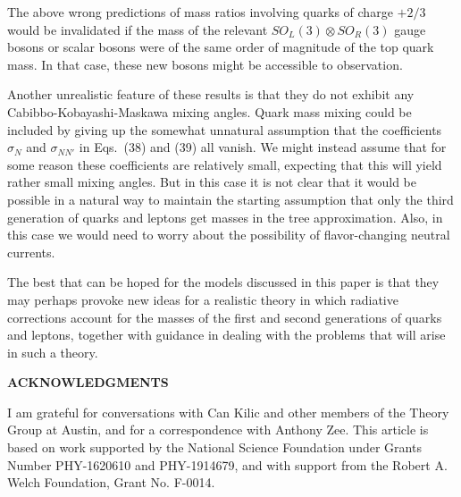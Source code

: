 \documentclass[12pt]{article}
\begin{document}
The above wrong predictions of mass ratios involving quarks of charge $+2/3$ would be invalidated if the mass of the relevant 
$SO_L(3)\otimes  SO_R(3)$ gauge bosons or scalar bosons were of the same order of magnitude of the top quark mass.  In that case, these new bosons might be accessible to observation.

Another unrealistic feature of these results is that they do not exhibit any Cabibbo-Kobayashi-Maskawa mixing angles.  Quark mass mixing could be included  by giving up the somewhat unnatural  assumption that the coefficients $\sigma_N$ and $\sigma_{NN'}$ in Eqs.~(38) and (39) all vanish.  
We might instead assume that for some reason these coefficients are relatively small, expecting that this will  yield rather small mixing angles.  But in this case it is not clear that it would be possible in a natural way to maintain the starting assumption that only the third generation of quarks and leptons get masses in the tree approximation.  Also, in this case we would need to worry about the possibility of flavor-changing neutral currents.

The best that can be hoped for the models discussed in this paper is that  they may perhaps provoke new ideas for  a realistic theory in which  radiative corrections  account for the masses of the first and second generations of quarks and leptons, together with  guidance in dealing with the problems that will arise in such a theory.

\begin{center}
 {\bf ACKNOWLEDGMENTS}
\end{center} 

I am grateful for conversations with Can Kilic and other members of the Theory Group at Austin, and for a correspondence with Anthony Zee.  This article is based on work supported by the National Science Foundation
 under Grants Number PHY-1620610 and PHY-1914679, and with support from the Robert A. Welch Foundation, Grant No. F-0014.
\end{document}
